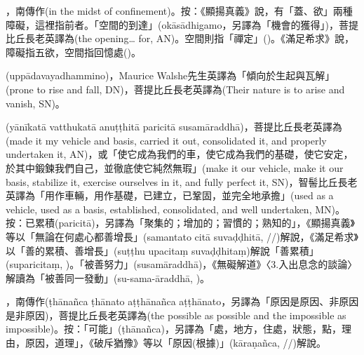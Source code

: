\startitemgroup[noteitems]
\item{}，南傳作(in the midst of confinement)。按：《顯揚真義》說，有「蓋、欲」兩種障礙，這裡指前者。「空間的到達」(okāsādhigamo，另譯為「機會的獲得」)，菩提比丘長老英譯為(the opening… for, AN)。空間則指「禪定」()。《滿足希求》說，障礙指五欲，空間指回憶處()。
\stopitemgroup

\startitemgroup[noteitems]
\item{}(uppādavayadhammino)，Maurice Walshe先生英譯為「傾向於生起與瓦解」(prone to rise and fall, DN)，菩提比丘長老英譯為(Their nature is to arise and vanish, SN)。
\stopitemgroup

\startitemgroup[noteitems]
\item{}(yānīkatā vatthukatā anuṭṭhitā paricitā susamāraddhā)，菩提比丘長老英譯為(made it my vehicle and basis, carried it out, consolidated it, and properly undertaken it, AN)，或「使它成為我們的車，使它成為我們的基礎，使它安定，於其中鍛鍊我們自己，並徹底使它純然無瑕」(make it our vehicle, make it our basis, stabilize it, exercise ourselves in it, and fully perfect it, SN)，智髻比丘長老英譯為「用作車輛，用作基礎，已建立，已鞏固，並完全地承擔」(used as a vehicle, used as a basis, established, consolidated, and well undertaken, MN)。按：已累積(paricitā)，另譯為「聚集的；增加的；習慣的；熟知的」，《顯揚真義》等以「無論在何處心都善增長」(samantato citā suvaḍḍhitā, //)解說，《滿足希求》以「善的累積、善增長」(suṭṭhu upacitaṃ suvaḍḍhitaṃ)解說「善累積」(suparicitaṃ, )。「被善努力」(susamāraddhā)，《無礙解道》〈3.入出息念的談論〉解讀為「被善同一發動」(su-sama-āraddhā, )。
\stopitemgroup

\startitemgroup[noteitems]
\item{}，南傳作(ṭhānañca ṭhānato aṭṭhānañca aṭṭhānato，另譯為「原因是原因、非原因是非原因)，菩提比丘長老英譯為(the possible as possible and the impossible as impossible)。按：「可能」(ṭhānañca)，另譯為「處，地方，住處，狀態，點，理由，原因，道理」，《破斥猶豫》等以「原因(根據)」(kāraṇañca, //)解說。
\stopitemgroup

